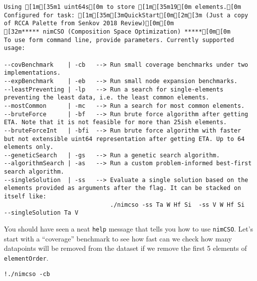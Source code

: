 \begin{verbatim}
Using [1m[35m1 uint64s[0m to store [1m[35m19[0m elements.[0m
Configured for task: [1m[35m[3mQuickStart[0m[2m[3m (Just a copy of RCCA Palette from Senkov 2018 Review)[0m[0m
[32m***** nimCSO (Composition Space Optimization) *****[0m[0m
To use form command line, provide parameters. Currently supported usage:

--covBenchmark    | -cb   --> Run small coverage benchmarks under two implementations.
--expBenchmark    | -eb   --> Run small node expansion benchmarks.
--leastPreventing | -lp   --> Run a search for single-elements preventing the least data, i.e. the least common elements.
--mostCommon      | -mc   --> Run a search for most common elements.
--bruteForce      | -bf   --> Run brute force algorithm after getting ETA. Note that it is not feasible for more than 25ish elements.
--bruteForceInt   | -bfi  --> Run brute force algorithm with faster but not extensible uint64 representation after getting ETA. Up to 64 elements only.
--geneticSearch   | -gs   --> Run a genetic search algorithm.
--algorithmSearch | -as   --> Run a custom problem-informed best-first search algorithm.
--singleSolution  | -ss   --> Evaluate a single solution based on the elements provided as arguments after the flag. It can be stacked on itself like:
                              ./nimcso -ss Ta W Hf Si  -ss V W Hf Si  --singleSolution Ta V
\end{verbatim}

You should have seen a neat \texttt{help} message that
tells you how to use \texttt{nimCSO}. Let's start with
a ``coverage'' benchmark to see how fast can we check how many
datapoints will be removed from the dataset if we remove the first 5
elements of \texttt{elementOrder}.

\begin{verbatim}
!./nimcso -cb
\end{verbatim}

